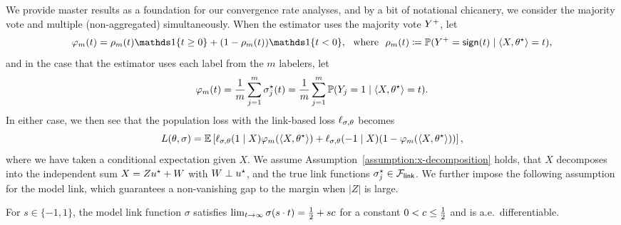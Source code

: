 We provide master results as a foundation for our convergence rate analyses,
and by a bit of notational chicanery, we consider the majority vote and
multiple (non-aggregated) simultaneously.
%
When the estimator uses the majority vote
$Y^+$, let
\begin{equation*}
  \varphi_m(t) = \rho_m(t) \ind \{t \geq 0\} + (1 - \rho_m(t)) \ind\{t < 0\},
  ~~ \mbox{where} ~~
  \rho_m(t) \defeq
  \P(\majY = \sgn(t) \mid \<X, \theta\opt\> = t),
\end{equation*}
and in the case that the estimator uses each label
from the $m$ labelers, let
\begin{equation*}
	\varphi_m(t) = \frac{1}{m} \sum_{j = 1}^m \sigma_j^\star(t)
	= \frac{1}{m} \sum_{j = 1}^m \mathbb{P}(Y_j = 1 \mid \langle X, \theta^\star\rangle = t).
\end{equation*}
In either case, we then see that the population loss with
the link-based loss $\ell_{\sigma,\theta}$ becomes
\begin{equation}
	\label{eqn:generic-loss}
	L(\theta, \sigma) = \mathbb{E}\left[\ell_{\sigma,\theta}(1 \mid X)
	\varphi_m(\langle X, \theta^\star\rangle)
	+ \ell_{\sigma,\theta}(-1 \mid X)
	(1 - \varphi_m(\langle X, \theta^\star\rangle))\right],
\end{equation}
where we have taken a conditional expectation given $X$. We assume
Assumption~\ref{assumption:x-decomposition} holds, that $X$ decomposes into
the independent sum $X= Zu^\star + W$ with $W \perp u^\star$, and the true link
functions $\sigma_j^\star \in \mathcal{F}_{\mathsf{link}}$.
%
We further impose the following
assumption for the model link, which guarantees a
non-vanishing gap to the margin when $|Z|$ is large.
\begin{assumption}
  \label{assumption:model-link}
  For $s \in \{-1, 1\}$,
  the model link function $\sigma$ satisfies
  $\lim_{t \to \infty} \sigma(s \cdot t) = \frac{1}{2} + sc$ for a constant
  $0 < c \le \frac{1}{2}$ and is a.e.\ differentiable.
\end{assumption}
